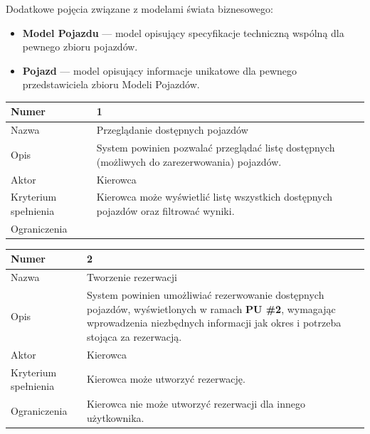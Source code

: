 \documentclass[eng,printmode,openany]{mgr}
\begin{document}
	Dodatkowe pojęcia związane z modelami świata biznesowego:
	\begin{itemize}
		\item \textbf{Model Pojazdu} — model opisujący specyfikacje techniczną wspólną dla pewnego zbioru pojazdów.
		\item \textbf{Pojazd} — model opisujący informacje unikatowe dla pewnego przedstawiciela zbioru Modeli Pojazdów.
	\end{itemize}
	
	\begin{table}[H]
		\begin{tabularx}{\textwidth}{|l|X|}
			\hline
			Numer                & 1  \\ \hline
			Nazwa                & Przeglądanie dostępnych pojazdów \\ \hline
			Opis                 & System powinien pozwalać przeglądać listę dostępnych (możliwych do zarezerwowania) pojazdów. \\ \hline
			Aktor                & Kierowca \\ \hline
			Kryterium spełnienia & Kierowca może wyświetlić listę wszystkich dostępnych pojazdów oraz filtrować wyniki. \\ \hline
			Ograniczenia         &  \\ \hline
		\end{tabularx}
	\end{table}
	
	\begin{table}[H]
		\begin{tabularx}{\textwidth}{|l|X|}
			\hline
			Numer                & 2 \\ \hline
			Nazwa                & Tworzenie rezerwacji \\ \hline
			Opis                 & System powinien umożliwiać rezerwowanie dostępnych pojazdów, wyświetlonych w ramach \textbf{PU \#2}, wymagając wprowadzenia niezbędnych informacji jak okres i potrzeba stojąca za rezerwacją. \\ \hline
			Aktor                & Kierowca \\ \hline
			Kryterium spełnienia & Kierowca może utworzyć rezerwację. \\ \hline
			Ograniczenia         & Kierowca nie może utworzyć rezerwacji dla innego użytkownika. \\ \hline
		\end{tabularx}
	\end{table}	
\end{document}

